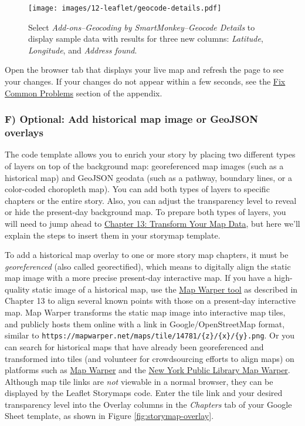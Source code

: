 \documentclass[
  english,
]{book}
\begin{document}
\begin{figure}
\centering
\texttt{[image: images/12-leaflet/geocode-details.pdf]}
\caption{\label{fig:geocode-details3}Select \emph{Add-ons--Geocoding by SmartMonkey--Geocode Details} to display sample data with results for three new columns: \emph{Latitude}, \emph{Longitude}, and \emph{Address found}.}
\end{figure}

Open the browser tab that displays your live map and refresh the page to see your changes. If your changes do not appear within a few seconds, see the \href{fix.html}{Fix Common Problems} section of the appendix.

\hypertarget{f-optional-add-historical-map-image-or-geojson-overlays}{%
\subsubsection*{F) Optional: Add historical map image or GeoJSON overlays}\label{f-optional-add-historical-map-image-or-geojson-overlays}}

The code template allows you to enrich your story by placing two different types of layers on top of the background map: georeferenced map images (such as a historical map) and GeoJSON geodata (such as a pathway, boundary lines, or a color-coded choropleth map). You can add both types of layers to specific chapters or the entire story. Also, you can adjust the transparency level to reveal or hide the present-day background map. To prepare both types of layers, you will need to jump ahead to \href{transform.html}{Chapter 13: Transform Your Map Data}, but here we'll explain the steps to insert them in your storymap template.

To add a historical map overlay to one or more story map chapters, it must be \emph{georeferenced} (also called georectified), which means to digitally align the static map image with a more precise present-day interactive map. If you have a high-quality static image of a historical map, use the \href{mapwarper.html}{Map Warper tool} as described in Chapter 13 to align several known points with those on a present-day interactive map. Map Warper transforms the static map image into interactive map tiles, and publicly hosts them online with a link in Google/OpenStreetMap format, similar to \texttt{https://mapwarper.net/maps/tile/14781/\{z\}/\{x\}/\{y\}.png}. Or you can search for historical maps that have already been georeferenced and transformed into tiles (and volunteer for crowdsourcing efforts to align maps) on platforms such as \href{https://mapwarper.net}{Map Warper} and the \href{http://maps.nypl.org/warper/}{New York Public Library Map Warper}. Although map tile links are \emph{not} viewable in a normal browser, they can be displayed by the Leaflet Storymaps code. Enter the tile link and your desired transparency level into the Overlay columns in the \emph{Chapters} tab of your Google Sheet template, as shown in Figure \ref{fig:storymap-overlay}.
\end{document}
